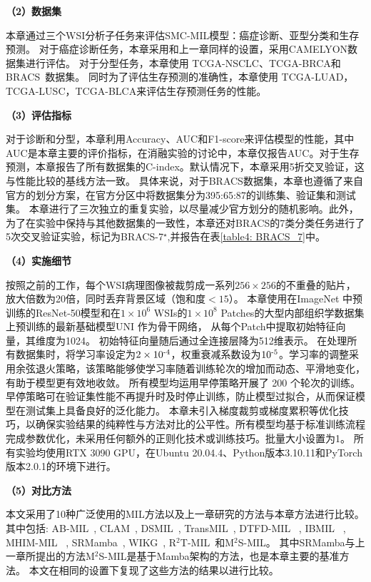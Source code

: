 \textbf{（2）数据集}

本章通过三个WSI分析子任务来评估SMC-MIL模型：癌症诊断、亚型分类和生存预测。
对于癌症诊断任务，本章采用和上一章同样的设置，采用CAMELYON数据集进行评估。
对于分型任务，本章使用 TCGA-NSCLC、TCGA-BRCA和BRACS~\cite{brancati2022bracs}数据集。
同时为了评估生存预测的准确性，本章使用 TCGA-LUAD，TCGA-LUSC，TCGA-BLCA来评估生存预测任务的性能。

\textbf{（3）评估指标}

对于诊断和分型，本章利用Accuracy、AUC和F1-score来评估模型的性能，其中AUC是本章主要的评价指标，在消融实验的讨论中，本章仅报告AUC。对于生存预测，本章报告了所有数据集的C-index。默认情况下，本章采用5折交叉验证，这与性能比较的基线方法一致。
具体来说，对于BRACS数据集，本章也遵循了来自官方的划分方案，在官方分区中将数据集分为395:65:87的训练集、验证集和测试集。
本章进行了三次独立的重复实验，以尽量减少官方划分的随机影响。此外，为了在实验中保持与其他数据集的一致性，本章还对BRACS的7类分类任务进行了5次交叉验证实验，标记为BRACS-7$^\star$,并报告在表\ref{table4: BRACS_7}中。

\textbf{（4）实施细节}

按照之前的工作\cite{lu2021data,zhang2022dtfd,tang2023multiple}，每个WSI病理图像被裁剪成一系列$256 \times 256$的不重叠的贴片，放大倍数为20倍，同时丢弃背景区域（饱和度$< 15$）。
本章使用在ImageNet \cite{deng2009imagenet}中预训练的ResNet-50模型\cite{he2016deep}和在$1\times 10^6$ WSIs的$1\times 10^8$ Patches的大型内部组织学数据集上预训练的最新基础模型UNI \cite{chen2024towards}作为骨干网络，
从每个Patch中提取初始特征向量，其维度为1024。
初始特征向量随后通过全连接层降为512维表示。
在处理所有数据集时，将学习率设定为$2 \times 10^{\textnormal{-}4}$，权重衰减系数设为$10^{\textnormal{-}5}$。学习率的调整采用余弦退火策略，该策略能够使学习率随着训练轮次的增加而动态、平滑地变化，有助于模型更有效地收敛。
所有模型均运用早停策略开展了 200 个轮次的训练。早停策略可在验证集性能不再提升时及时停止训练，防止模型过拟合，从而保证模型在测试集上具备良好的泛化能力。
本章未引入梯度裁剪或梯度累积等优化技巧，以确保实验结果的纯粹性与方法对比的公平性。所有模型均基于标准训练流程完成参数优化，未采用任何额外的正则化技术或训练技巧。批量大小设置为1。
所有实验均使用RTX 3090 GPU，在Ubuntu 20.04.4、Python版本3.10.11和PyTorch版本2.0.1的环境下进行。

\textbf{（5）对比方法}

本文采用了10种广泛使用的MIL方法以及上一章研究的方法与本章方法进行比较。
其中包括: AB-MIL~\cite{ilse2018attention},  CLAM~\cite{lu2021data}, 
DSMIL~\cite{li2021dual}, TransMIL~\cite{shao2021transmil}, DTFD-MIL ~\cite{zhang2022dtfd},
IBMIL ~\cite{lin2023interventional}, MHIM-MIL ~\cite{tang2023multiple},
SRMamba~\cite{yang2024mambamil}, WIKG~\cite{li2024dynamic},
R$^2$T-MIL~\cite{tang2024feature}和M$^2$S-MIL。
其中SRMamba与上一章所提出的方法M$^2$S-MIL是基于Mamba架构的方法，也是本章主要的基准方法。
本文在相同的设置下复现了这些方法的结果以进行比较。

